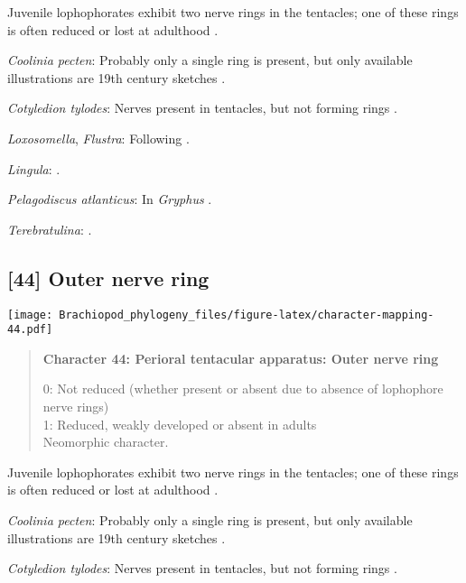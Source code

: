 \documentclass[openany]{book}
\theoremstyle{definition}
\theoremstyle{definition}
\theoremstyle{definition}
\theoremstyle{remark}
\begin{document}
Juvenile lophophorates exhibit two nerve rings in the tentacles; one of
these rings is often reduced or lost at adulthood
\citep{Temereva2017Innervationof}.

\hypertarget{Coolinia_pecten-coding-43}{}
\emph{Coolinia pecten}: Probably only a single ring is present, but only
available illustrations are 19th century sketches \citep{Luter2016}.

\hypertarget{Cotyledion_tylodes-coding-43}{}
\emph{Cotyledion tylodes}: Nerves present in tentacles, but not forming
rings \citep{Fuchs2006}.

\hypertarget{Flustra-coding-43}{}
\emph{Loxosomella}, \emph{Flustra}: Following
\citet{Temereva2017Innervationof}.

\hypertarget{Lingula-coding-43}{}
\emph{Lingula}: \citep{Temereva2017Innervationof}.

\hypertarget{Pelagodiscus_atlanticus-coding-43}{}
\emph{Pelagodiscus atlanticus}: In \emph{Gryphus}
\citep{Temereva2017Thefirst}.

\hypertarget{Terebratulina-coding-43}{}
\emph{Terebratulina}: \citet{Temereva2017Thefirst}.

\subsection*{{[}44{]} Outer nerve ring}\label{outer-nerve-ring}

\texttt{[image: Brachiopod\_phylogeny\_files/figure-latex/character-mapping-44.pdf]}

\begin{quote}
\textbf{Character 44: Perioral tentacular apparatus: Outer nerve ring}

0: Not reduced (whether present or absent due to absence of lophophore
nerve rings)\\
1: Reduced, weakly developed or absent in adults\\
Neomorphic character.
\end{quote}

Juvenile lophophorates exhibit two nerve rings in the tentacles; one of
these rings is often reduced or lost at adulthood
\citep{Temereva2017Innervationof}.

\hypertarget{Coolinia_pecten-coding-44}{}
\emph{Coolinia pecten}: Probably only a single ring is present, but only
available illustrations are 19th century sketches \citep{Luter2016}.

\hypertarget{Cotyledion_tylodes-coding-44}{}
\emph{Cotyledion tylodes}: Nerves present in tentacles, but not forming
rings \citep{Fuchs2006}.
\end{document}
